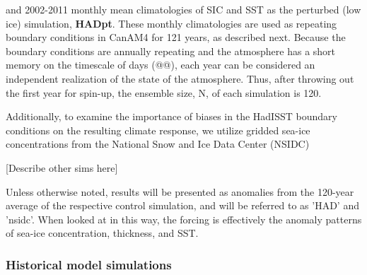 \documentclass[twocol]{ametsoc}
\begin{document}
 and 2002-2011 monthly mean climatologies of SIC and SST as the perturbed (low ice) simulation, \textbf{HADpt}. These monthly climatologies are used as repeating boundary conditions in CanAM4 for 121 years, as described next. Because the boundary conditions are annually repeating and the atmosphere has a short memory on the timescale of days (@@), each year can be considered an independent realization of the state of the atmosphere. Thus, after throwing out the first year for spin-up, the ensemble size, N, of each simulation is 120.  %


Additionally, to examine the importance of biases in the HadISST boundary conditions on the resulting climate response, we utilize gridded sea-ice concentrations from the National Snow and Ice Data Center (NSIDC)

[Describe other sims here]

Unless otherwise noted, results will be presented as anomalies from the 120-year average of the respective control simulation, and will be referred to as 'HAD' and 'nsidc'. When looked at in this way, the forcing is effectively the anomaly patterns of sea-ice concentration, thickness, and SST. 
 
\subsubsection{Historical model simulations}
\end{document}
